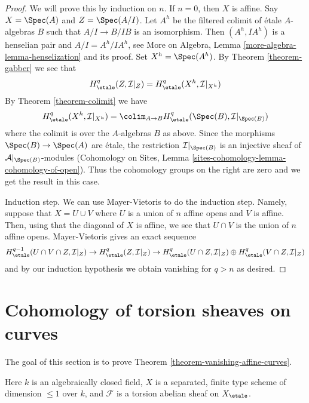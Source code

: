\begin{proof}
We will prove this by induction on $n$. If $n = 0$, then $X$ is affine.
Say $X = \Spec(A)$ and $Z = \Spec(A/I)$. Let $A^h$ be the filtered colimit
of \'etale $A$-algebras $B$ such that $A/I \to B/IB$ is an isomorphism.
Then $(A^h, IA^h)$ is a henselian pair and $A/I = A^h/IA^h$, see
More on Algebra, Lemma \ref{more-algebra-lemma-henselization}
and its proof. Set $X^h = \Spec(A^h)$.
By Theorem \ref{theorem-gabber}
we see that
$$
H^q_\etale(Z, \mathcal{I}|_Z) = H^q_\etale(X^h, \mathcal{I}|_{X^h})
$$
By Theorem \ref{theorem-colimit} we have
$$
H^q_\etale(X^h, \mathcal{I}|_{X^h}) =
\colim_{A \to B} H^q_\etale(\Spec(B), \mathcal{I}|_{\Spec(B)})
$$
where the colimit is over the $A$-algebras $B$ as above.
Since the morphisms $\Spec(B) \to \Spec(A)$ are \'etale,
the restriction $\mathcal{I}|_{\Spec(B)}$ is an injective
sheaf of $\mathcal{A}|_{\Spec(B)}$-modules
(Cohomology on Sites, Lemma \ref{sites-cohomology-lemma-cohomology-of-open}).
Thus the cohomology groups on the right are zero and we get the
result in this case.

\medskip\noindent
Induction step. We can use Mayer-Vietoris to do the induction step.
Namely, suppose that $X = U \cup V$ where $U$ is a union of $n$ affine
opens and $V$ is affine. Then, using that the diagonal of $X$ is affine,
we see that $U \cap V$ is the union of $n$ affine opens. Mayer-Vietoris
gives an exact sequence
$$
H^{q - 1}_\etale(U \cap V \cap Z, \mathcal{I}|_Z) \to
H^q_\etale(Z, \mathcal{I}|_Z) \to
H^q_\etale(U \cap Z, \mathcal{I}|_Z) \oplus
H^q_\etale(V \cap Z, \mathcal{I}|_Z)
$$
and by our induction hypothesis we obtain vanishing for $q > n$ as desired.
\end{proof}





\section{Cohomology of torsion sheaves on curves}
\label{section-vanishing-torsion}

\noindent
The goal of this section is to prove
Theorem \ref{theorem-vanishing-affine-curves}.

\begin{situation}
\label{situation-what-to-prove}
Here $k$ is an algebraically closed field, $X$ is a separated, finite type
scheme of dimension $\leq 1$ over $k$, and $\mathcal{F}$ is a torsion
abelian sheaf on $X_\etale$.
\end{situation}

